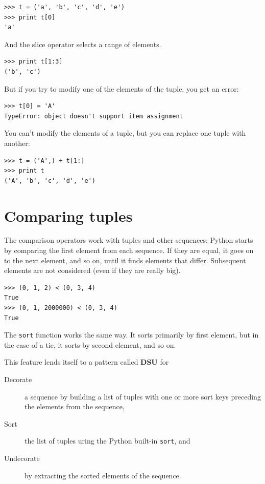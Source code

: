 \documentclass[10pt]{book}
\begin{document}
\beforeverb
\begin{verbatim}
>>> t = ('a', 'b', 'c', 'd', 'e')
>>> print t[0]
'a'
\end{verbatim}
\afterverb
%
And the slice operator selects a range of elements.


\beforeverb
\begin{verbatim}
>>> print t[1:3]
('b', 'c')
\end{verbatim}
\afterverb
%
But if you try to modify one of the elements of the tuple, you get
an error:


\beforeverb
\begin{verbatim}
>>> t[0] = 'A'
TypeError: object doesn't support item assignment
\end{verbatim}
\afterverb
%
You can't modify the elements of a tuple, but you can replace
one tuple with another:

\beforeverb
\begin{verbatim}
>>> t = ('A',) + t[1:]
>>> print t
('A', 'b', 'c', 'd', 'e')
\end{verbatim}
\afterverb
%

\section{Comparing tuples}


The comparison operators work with tuples and other sequences;
Python starts by comparing the first element from each
sequence.  If they are equal, it goes on to the next element,
and so on, until it finds elements that differ.  Subsequent
elements are not considered (even if they are really big).

\beforeverb
\begin{verbatim}
>>> (0, 1, 2) < (0, 3, 4)
True
>>> (0, 1, 2000000) < (0, 3, 4)
True
\end{verbatim}
\afterverb
%
The {\tt sort} function works the same way.  It sorts 
primarily by first element, but in the case of a tie, it sorts
by second element, and so on.  

This feature lends itself to a pattern called {\bf DSU} for 

\begin{description}

\item[Decorate] a sequence by building a list of tuples
with one or more sort keys preceding the elements from the sequence,

\item[Sort] the list of tuples uring the Python built-in {\tt sort}, and

\item[Undecorate] by extracting the sorted elements of the sequence.

\end{description}
\end{document}
